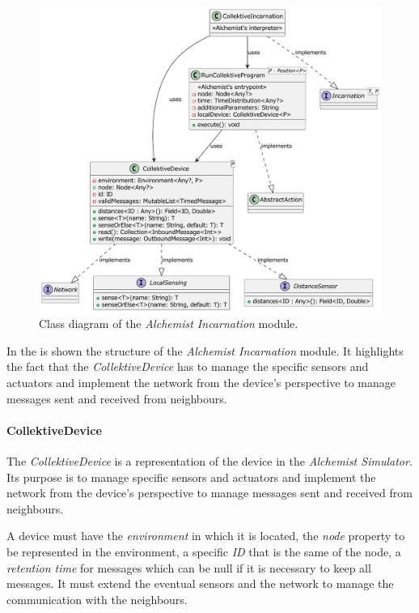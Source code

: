 \begin{figure}
    \centering
    \includegraphics[width=\textwidth]{figures/incarnation-class-diagram}
    \caption{Class diagram of the \emph{Alchemist Incarnation} module.}
    \label{fig:incarnation-class-diagram}
\end{figure}

In the  is shown the structure of the \emph{Alchemist Incarnation} module.
It highlights the fact that the \emph{CollektiveDevice} has to manage the specific sensors and actuators and implement
the network from the device's perspective to manage messages sent and received from neighbours.

\paragraph{CollektiveDevice}
The \emph{CollektiveDevice} is a representation of the device in the \emph{Alchemist Simulator}.
Its purpose is to manage specific sensors and actuators and implement the network from the device's perspective to
manage messages sent and received from neighbours.

A device must have the \emph{environment} in which it is located, the \emph{node} property to be represented in the environment,
a specific \emph{ID} that is the same of the node, a \emph{retention time} for messages which can be null if it is necessary
to keep all messages.
It must extend the eventual sensors and the network to manage the communication with the neighbours.

